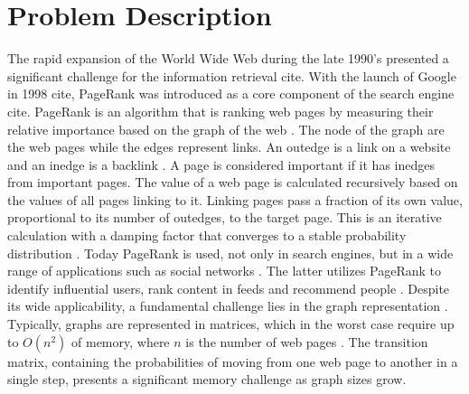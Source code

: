 \documentclass[a4paper,12pt]{article}
\begin{document}
\section{Problem Description}
The rapid expansion of the World Wide Web during the late 1990's presented a significant challenge for the information retrieval cite. With the launch of Google in 1998 cite, PageRank was introduced as a core component of the search engine cite. PageRank is an algorithm that is ranking web pages by measuring their relative importance based on the graph of the web \cite{page_pagerank_1999}. The node of the graph are the web pages while the edges represent links. An outedge is a link on a website and an inedge is a backlink \cite{page_pagerank_1999}. A page is considered important if it has inedges from important pages. The value of a web page is calculated recursively based on the values of all pages linking to it. Linking pages pass a fraction of its own value, proportional to its number of outedges, to the target page. This is an iterative calculation with a damping factor that converges to a stable probability distribution \cite{page_pagerank_1999}. 
Today PageRank is used, not only in search engines, but in a wide range of applications such as social networks \cite{wu_efficient_2024}. The latter utilizes PageRank to identify influential users, rank content in feeds and recommend people \cite{weng_twitterrank_2010}. Despite its wide applicability, a fundamental challenge lies in the graph representation \cite{liu_fast_2015}. Typically, graphs are represented in matrices, which in the worst case require up to $O(n^2)$ of memory, where $n$ is the number of web pages \cite{wu_efficient_2024}. The transition matrix, containing the probabilities of moving from one web page to another in a single step, presents a significant memory challenge as graph sizes grow. 

\end{document}

